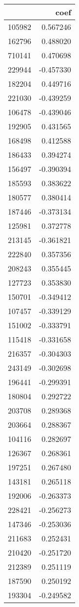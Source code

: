 \begin{tabular}{lr}
\toprule
 & coef \\
\midrule
105982 & 0.567246 \\
162796 & 0.488020 \\
710141 & 0.470698 \\
229944 & -0.457330 \\
182204 & 0.449716 \\
221030 & -0.439259 \\
106478 & -0.439046 \\
192905 & 0.431565 \\
168498 & 0.412588 \\
186433 & 0.394274 \\
156497 & -0.390394 \\
185593 & 0.383622 \\
180577 & 0.380414 \\
187446 & -0.373134 \\
125981 & 0.372778 \\
213145 & -0.361821 \\
222840 & 0.357356 \\
208243 & 0.355445 \\
127723 & 0.353830 \\
150701 & -0.349412 \\
107457 & -0.339129 \\
151002 & -0.333791 \\
115418 & -0.331658 \\
216357 & -0.304303 \\
243149 & -0.302698 \\
196441 & -0.299391 \\
180804 & 0.292722 \\
203708 & 0.289368 \\
203664 & 0.288367 \\
104116 & 0.282697 \\
126367 & 0.268361 \\
197251 & 0.267480 \\
143181 & 0.265118 \\
192006 & -0.263373 \\
228421 & -0.256273 \\
147346 & -0.253036 \\
211683 & 0.252431 \\
210420 & -0.251720 \\
212389 & 0.251119 \\
187590 & 0.250192 \\
193304 & -0.249582 \\

\end{tabular}
